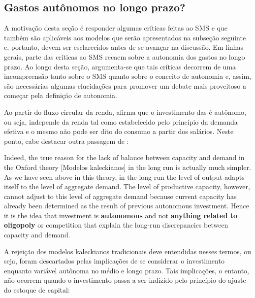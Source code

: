 \subsection{Gastos autônomos no longo prazo?}
\label{CrescimentoAutonomo}

A motivação desta seção é responder algumas críticas feitas ao SMS e que também são aplicáveis aos modelos que serão apresentados na subseção seguinte e, portanto, devem ser esclarecidos antes de se avançar na discussão.
Em linhas gerais, parte das críticas ao SMS recaem sobre a autonomia dos gastos no longo prazo. Ao longo desta seção, argumenta-se que tais críticas decorrem de uma incompreensão tanto sobre o SMS quanto sobre o conceito de autonomia e, assim, são necessárias algumas elucidações para promover um debate mais proveitoso a começar pela definição de autonomia.


Ao partir do fluxo circular da renda, \textcite{serrano_long_1995} afirma que o investimento das é autônomo, ou seja, independe da renda tal como estabelecido pelo princípio da demanda efetiva e o mesmo não pode ser dito do consumo a partir dos salários. 
Neste ponto, cabe destacar outra passagem de \textcite[p.~120, grifos adicionados]{serrano_sraffian_1995}:

\begin{citacao}
	Indeed, the true reason for the lack of balance between capacity and demand in the Oxford theory [Modelos kaleckianos] in the long run is actually much simpler. As we have seen above in this theory, in the long run the level of output adapts itself to the level of aggregate demand. The level of productive capacity, however, cannot adjust to this level of aggregate demand because current capacity has already been determined as the result of previous autonomous investment. Hence it is the idea that investment is \textbf{autonomous} and not \textbf{anything related to oligopoly} or competition that explain the long-run discrepancies between capacity and demand.
\end{citacao}
A rejeição dos modelos kaleckianos tradicionais deve entendidas nesses termos, ou seja, foram descartados pelas implicações de se considerar o investimento enquanto variável autônoma no médio  e longo prazo.
Tais implicações, o entanto, não ocorrem quando o investimento passa a ser indizido pelo princípio do ajuste do estoque de capital:

